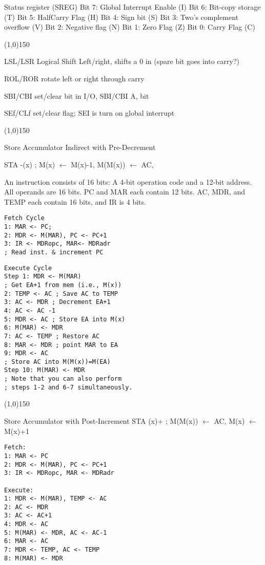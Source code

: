 \documentclass[8pt]{article}
\begin{document}
\begin{multicols}{3}
Status register (SREG) 
Bit 7: Global Interrupt Enable (I)
Bit 6: Bit-copy storage (T)
Bit 5: HalfCarry Flag (H)
Bit 4: Sign bit (S)
Bit 3: Two's complement overflow (V)
Bit 2: Negative flag (N)
Bit 1: Zero Flag (Z)
Bit 0: Carry Flag (C)

\line(1,0){150}

LSL/LSR Logical Shift Left/right, shifts a 0 in (spare bit goes into carry?)

ROL/ROR rotate left or right through carry

SBI/CBI set/clear bit in I/O, SBI/CBI A, bit

SEf/CLf set/clear flag; SEI is turn on global interrupt

\line(1,0){150}

Store Accumulator Indirect with Pre-Decrement

STA -(x) ; M(x) $\leftarrow$ M(x)-1, M(M(x)) $\leftarrow$ AC,

An instruction consists of 16 bits: A 4-bit operation code and a 12-bit
address. All operands are 16 bits. PC and MAR each contain 12 bits. AC, MDR,
and TEMP each contain 16 bits, and IR is 4 bits.


\begin{verbatim}
Fetch Cycle
1: MAR <- PC;
2: MDR <- M(MAR), PC <- PC+1
3: IR <- MDRopc, MAR<- MDRadr 
; Read inst. & increment PC
\end{verbatim}

\begin{verbatim}
Execute Cycle
Step 1: MDR <- M(MAR) 
; Get EA+1 from mem (i.e., M(x))
2: TEMP <- AC ; Save AC to TEMP
3: AC <- MDR ; Decrement EA+1
4: AC <- AC -1
5: MDR <- AC ; Store EA into M(x)
6: M(MAR) <- MDR
7: AC <- TEMP ; Restore AC
8: MAR <- MDR ; point MAR to EA
9: MDR <- AC 
; Store AC into M(M(x))=M(EA)
Step 10: M(MAR) <- MDR
; Note that you can also perform 
; steps 1-2 and 6-7 simultaneously.
\end{verbatim}


\line(1,0){150}

Store Accumulator with Post-Increment
STA (x)+ ; M(M(x)) $\leftarrow$ AC, M(x) $\leftarrow$ M(x)+1

\begin{verbatim}
Fetch: 
1: MAR <- PC
2: MDR <- M(MAR), PC <- PC+1
3: IR <- MDRopc, MAR <- MDRadr

Execute: 
1: MDR <- M(MAR), TEMP <- AC
2: AC <- MDR
3: AC <- AC+1
4: MDR <- AC
5: M(MAR) <- MDR, AC <- AC-1
6: MAR <- AC
7: MDR <- TEMP, AC <- TEMP
8: M(MAR) <- MDR
\end{verbatim}


\end{multicols}
\end{document}
